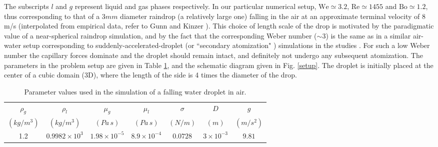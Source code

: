 The subscripts $l$ and $g$ represent liquid and gas phases respectively. 
In our particular numerical setup, $\textrm{We}\simeq 3.2 $, 
$\textrm{Re} \simeq 1455 $ and $\textrm{Bo} \simeq 1.2 $,
thus corresponding to that of a $3mm$ diameter raindrop (a relatively large one) 
falling in the air at an approximate terminal velocity of  
$8$ m/s (interpolated from empirical data, refer to Gunn and Kinzer \cite{gunn1949}). 
This choice of length scale of the drop is motivated by the paradigmatic value
of a near-spherical raindrop simulation, and by the fact that the corresponding Weber
number ($\sim 3$) is the same as in a similar air-water setup corresponding to  
suddenly-accelerated-droplet (or ``secondary atomization" ) simulations in the studies \cite{xiao2012,xiao2014large}.
For such a low Weber number the capillary forces dominate and the 
droplet should remain intact, and definitely not undergo any subsequent atomization. 
The parameters in the problem setup are given in Table \ref{raindropprop}, 
and the schematic diagram given in Fig. \ref{setup}. 
The droplet is initially placed at the center of a cubic domain (3D), 
where the length of the side is 4 times the diameter of the drop. 

\begin{table}[h!]
\begin{center}
\begin{tabular}{ccccccc}
\hline\hline
$\rho_{g}$ & $\rho_{l}$ & $\mu_{g}$ 
& $\mu_{l}$ & $\sigma$ & $D$ & $g$\\
$\left(kg/m^3\right)$ & $\left(kg/m^3\right)$ & $\left(Pa \, s\right)$ 
& $\left(Pa \,s \right)$ & $\left(N/m\right)$ & $(m)$ & $(m /s^{2})$ \\
\hline
1.2 & $0.9982 \times 10^3$ & $1.98 \times 10^{-5}$ & 
$8.9 \times 10^{-4}$ & $0.0728$ & $3 \times 10^{-3}$ & $9.81$\\
\hline\hline
\end{tabular}
\caption{Parameter values used in the simulation 
	of a falling water droplet in air. \label{raindropprop}}
\end{center}
\end{table}


